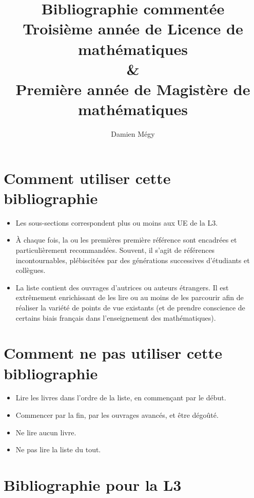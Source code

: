 \documentclass{article}
\begin{document}
\author{Damien Mégy}
\title{Bibliographie commentée\\Troisième année de Licence de mathématiques \\ \&\\ Première année de Magistère de mathématiques}

\maketitle
\tableofcontents

\section*{Comment utiliser cette bibliographie}
\begin{itemize}
\item Les sous-sections correspondent plus ou moins aux UE de la L3.
\item À chaque fois, la ou les premières première référence sont encadrées et  particulièrement recommandées. Souvent, il s'agit de références incontournables, plébiscitées par des générations successives d'étudiants et collègues. 
\item La liste contient des ouvrages d'autrices ou auteurs étrangers. Il est  extrêmement enrichissant de les lire ou au moins de les parcourir afin de réaliser la variété de points de vue existants (et de prendre conscience de certains biais français dans l'enseignement des mathématiques).
\end{itemize}

\section*{Comment ne pas utiliser cette bibliographie}
\begin{itemize}
\item Lire les livres dans l'ordre de la liste, en commençant par le début.
\item Commencer par la fin, par les ouvrages avancés, et être dégoûté.
\item Ne lire aucun livre.
\item Ne pas lire la liste du tout.
\end{itemize}

\newpage
\section{Bibliographie pour la L3}
\end{document}
